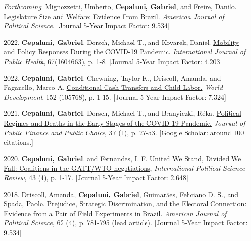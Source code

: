\documentclass[a4paper,11.5pt]{article}
\renewenvironment{itemize}{
	\begin{list}{}{
			\setlength{\leftmargin}{1.5em}
		}
		}{
	\end{list}
}
\begin{document}
\begin{itemize}
	
	\item \emph{Forthcoming.} Mignozzetti, Umberto, \textbf{Cepaluni, Gabriel}, and Freire, Danilo. \href{https://github.com/umbertomig/legislature-size-welfare}{Legislature Size and Welfare: Evidence From Brazil}. \textit{American Journal of Political Science}. [Journal 5-Year Impact Factor: 9.534]
	
	\item 2022. \textbf{Cepaluni, Gabriel}, Dorsch, Michael T., and Kovarek, Daniel. \href{https://internal-journal.ssph-journal.org/articles/10.3389/ijph.2022.1604663/full}{Mobility and Policy Responses During the COVID-19 Pandemic.} \textit{International Journal of Public Health}, 67(1604663), p. 1-8. [Journal 5-Year Impact Factor: 4.203]
	
	\item 2022. \textbf{Cepaluni, Gabriel}, Chewning, Taylor K., Driscoll, Amanda, and  Faganello, Marco A. \href{https://www.sciencedirect.com/science/article/pii/S0305750X21003831?casa_token=seI6YOJMdUAAAAAA:6-vwCPsSxext792LA9tHLHo8Bex1Q2MdfmAxZOF7GNJGYZ8oBRM-Laldb48bHRa-zdiP29DpQw}{Conditional Cash Transfers and Child Labor.} \textit{World Development}, 152 (105768), p. 1-15. [Journal 5-Year Impact Factor: 7.324]
	
	\item 2021. \textbf{Cepaluni, Gabriel}, Dorsch, Michael T., and Branyiczki, Réka. \href{https://bristoluniversitypressdigital.com/view/journals/jpfpc/37/1/article-p27.xml}{Political Regimes and Deaths in the Early Stages of the COVID-19 Pandemic.} \textit{Journal of Public Finance and Public Choice}, 37 (1), p. 27-53. [Google Scholar: around 100 citations.]
	
	\item 2020. \textbf{Cepaluni, Gabriel}, and Fernandes, I. F. \href{https://tinyurl.com/yw8px7h9}{United We Stand, Divided We Fall: Coalitions in the GATT/WTO negotiations,} \textit{International Political Science Review}, 43 (4), p. 1-17. [Journal 5-Year Impact Factor: 2.648]
	
	\item 2018. Driscoll, Amanda, \textbf{Cepaluni, Gabriel}, Guimarães, Feliciano D. S., and Spada, Paolo. \href{https://tinyurl.com/4xw2vtct}{Prejudice, Strategic Discrimination, and the Electoral Connection: Evidence from a Pair of Field Experiments in Brazil.} \textit{American Journal of Political Science}, 62 (4), p. 781-795 (lead article). [Journal 5-Year Impact Factor: 9.534]
	

\end{itemize}
\end{document}
